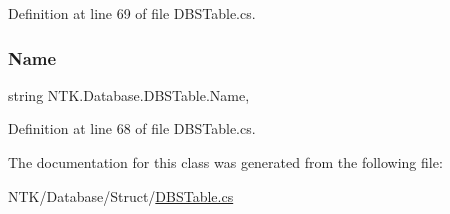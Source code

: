 Definition at line 69 of file D\+B\+S\+Table.\+cs.

\mbox{\label{class_n_t_k_1_1_database_1_1_d_b_s_table_acb883634047ff270db786cf12c02b3f4}} 
\subsubsection{\texorpdfstring{Name}{Name}}
{\footnotesize\ttfamily string N\+T\+K.\+Database.\+D\+B\+S\+Table.\+Name\hspace{0.3cm}{\ttfamily [get]}, {\ttfamily [set]}}



Definition at line 68 of file D\+B\+S\+Table.\+cs.



The documentation for this class was generated from the following file\+:\begin{DoxyCompactItemize}
\item 
N\+T\+K/\+Database/\+Struct/\mbox{\hyperlink{_d_b_s_table_8cs}{D\+B\+S\+Table.\+cs}}\end{DoxyCompactItemize}
